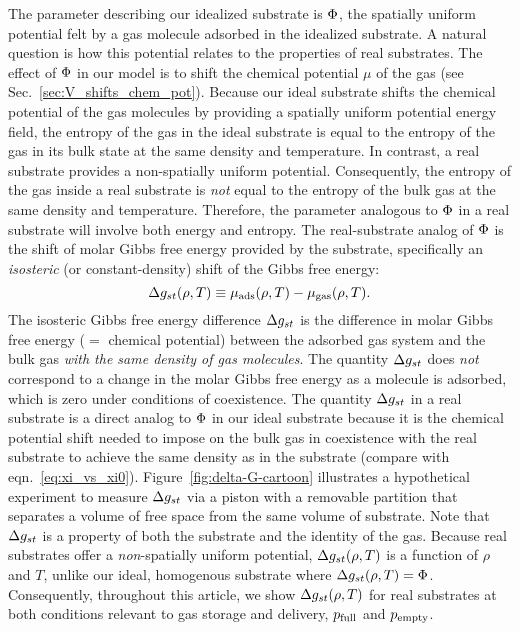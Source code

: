The parameter describing our idealized substrate is $\Phi$, the spatially uniform
potential felt by a gas molecule adsorbed in the idealized substrate. A natural
question is how this potential relates to the properties of real substrates.
The effect of $\Phi$ in our model is to shift the chemical potential $\mu$ of the
gas (see Sec.~\ref{sec:V_shifts_chem_pot}). Because our ideal substrate shifts
the chemical potential of the gas molecules by providing a spatially uniform
potential energy field, the entropy of the gas in the ideal substrate is equal
to the entropy of the gas in its bulk state at the same density and
temperature. In contrast, a real substrate provides a non-spatially uniform
potential. Consequently, the entropy of the gas inside a real substrate is
\emph{not} equal to the entropy of the bulk gas at the same density and
temperature. Therefore, the parameter analogous to $\Phi$ in a real substrate
will involve both energy and entropy. The real-substrate analog of $\Phi$ is the
shift of molar Gibbs free energy provided by the substrate, specifically an
\emph{isosteric} (or constant-density) shift of the Gibbs free energy:
\begin{equation}
   \Delta g_{st}(\rho, T) \equiv
    \mu_{\text{ads}}(\rho, T) - \mu_{\text{gas}}(\rho, T).
  \label{eq:g_st}
\end{equation}
The isosteric Gibbs free energy difference $\Delta g_{st}$ is the difference in molar
Gibbs free energy ($=$ chemical potential) between the adsorbed gas system and
the bulk gas \emph{with the same density of gas molecules}. The quantity $\Delta g_{st}$
does \emph{not} correspond to a change in the molar Gibbs free energy as a
molecule is adsorbed, which is zero under conditions of coexistence. The
quantity $\Delta g_{st}$ in a real substrate is a direct analog to $\Phi$ in our ideal
substrate because it is the chemical potential shift needed to impose on the
bulk gas in coexistence with the real substrate to achieve the same density as
in the substrate (compare with eqn.~\ref{eq:xi_vs_xi0}).
Figure~\ref{fig:delta-G-cartoon} illustrates a hypothetical experiment to
measure $\Delta g_{st}$ via a piston with a removable partition that separates a volume
of free space from the same volume of substrate. Note that $\Delta g_{st}$ is a property
of both the substrate and the identity of the gas. Because real substrates
offer a \emph{non}-spatially uniform potential, $\Delta g_{st}(\rho, T)$ is a function
of $\rho$ and $T$, unlike our ideal, homogenous substrate where $\Delta g_{st}(\rho,
T)=\Phi$. Consequently, throughout this article, we show $\Delta g_{st}(\rho, T)$ for real
substrates at both conditions relevant to gas storage and delivery, $p_{\text{full}}$
and $p_{\text{empty}}$.

